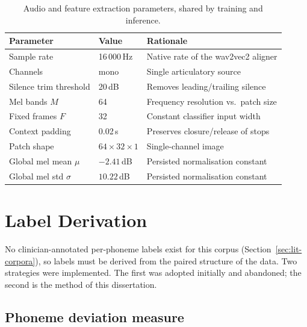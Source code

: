 \begin{table}[H]
\centering
\caption[Audio and feature extraction parameters]{Audio and feature extraction
parameters, shared by training and inference.}
\label{tab:feature-params}
\begin{tabular}{@{}llp{6.6cm}@{}}
\toprule
\textbf{Parameter} & \textbf{Value} & \textbf{Rationale} \\
\midrule
Sample rate            & 16\,000\,Hz & Native rate of the wav2vec2 aligner \\
Channels               & mono        & Single articulatory source \\
Silence trim threshold & 20\,dB      & Removes leading/trailing silence \\
Mel bands $M$          & 64          & Frequency resolution vs.\ patch size \\
Fixed frames $F$       & 32          & Constant classifier input width \\
Context padding        & 0.02\,s     & Preserves closure/release of stops \\
Patch shape            & $64\times32\times1$ & Single-channel image \\
Global mel mean $\mu$  & $-2.41$\,dB & Persisted normalisation constant \\
Global mel std $\sigma$& $10.22$\,dB & Persisted normalisation constant \\
\bottomrule
\end{tabular}
\end{table}

\section{Label Derivation}
\label{sec:labelling}

No clinician-annotated per-phoneme labels exist for this corpus
(Section~\ref{sec:lit-corpora}), so labels must be derived from the paired
structure of the data. Two strategies were implemented. The first was adopted
initially and abandoned; the second is the method of this dissertation.

\subsection{Phoneme deviation measure}

